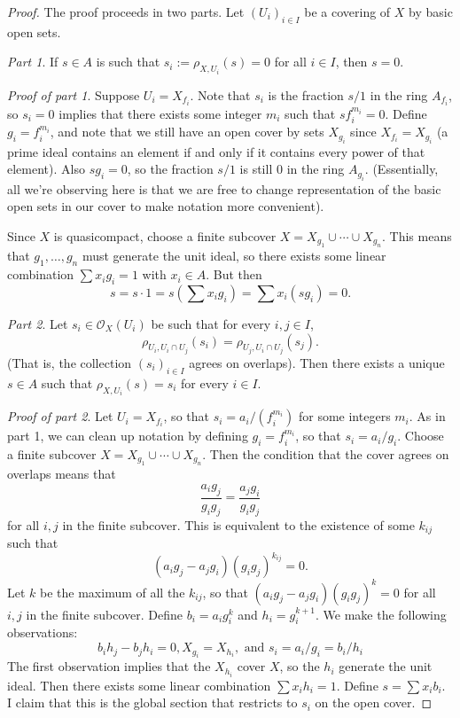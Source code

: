 \begin{proof}
The proof proceeds in two parts. Let $ (U_i)_{i \in I}$ be a
covering of $ X$ by basic open sets.

\emph{Part 1}. If $ s \in A$ is such that $ s_i := \rho_{X,
U_i}(s) = 0$ for all $ i \in I$, then $ s = 0$.

\emph{Proof of part 1}. Suppose $ U_i = X_{f_i}$. Note that $
s_i$ is the fraction $ s/1$ in the ring $ A_{f_i}$, so $ s_i =
0$ implies that there exists some integer $ m_i$ such that $
sf_i^{m_i} = 0$. Define $ g_i = f_i ^{m_i}$, and note that we
still have an open cover by sets $ X_{g_i}$ since $ X_{f_i} =
X_{g_i}$ (a prime ideal contains an element if and only if it
contains every power of that element). Also $ s g_i = 0$, so the
fraction $ s/1$ is still $ 0$ in the ring $ A_{g_i}$.
(Essentially, all we're observing here is that we are free to
change representation of the basic open sets in our cover to
make notation more convenient).

Since $ X$ is quasicompact, choose a finite subcover $ X =
X_{g_1} \cup \dotsb \cup X_{g_n}$. This means that $ g_1,
\dotsc, g_n$ must generate the unit ideal, so there exists some
linear combination $ \sum x_i g_i = 1$ with $ x_i \in A$. But
then
\[ s = s \cdot 1 = s \left( \sum x_i g_i \right) = \sum x_i (s
g_i) = 0.\]

\emph{Part 2}. Let $ s_i \in \mathcal{O}_X(U_i)$ be such that
for every $ i, j \in I$,
\[ \rho_{U_i, U_i \cap U_j}(s_i) = \rho_{U_j, U_i \cap
U_j}(s_j).\]
(That is, the collection $ (s_i)_{i \in I}$ agrees on overlaps).
Then there exists a unique $ s \in A$ such that $ \rho_{X,
U_i}(s) = s_i$ for every $ i \in I$.

\emph{Proof of part 2}. Let $ U_i = X_{f_i}$, so that $ s_i =
a_i/(f_i^{m_i})$ for some integers $ m_i$. As in part 1, we can
clean up notation by defining $ g_i = f_i^{m_i}$, so that $ s_i
= a_i/g_i$. Choose a finite subcover $ X = X_{g_1} \cup \dotsb
\cup X_{g_n}$. Then the condition that the cover agrees on
overlaps means that
\[ \frac{a_i g_j}{g_i g_j} = \frac{a_j g_i}{g_i g_j} \]
for all $ i, j$ in the finite subcover. This is equivalent to
the existence of some $ k_{ij}$ such that
\[ (a_i g_j - a_j g_i) (g_i g_j)^{k_{ij}} = 0.\]
Let $ k$ be the maximum of all the $ k_{ij}$, so that $ (a_i g_j
- a_j g_i)(g_i g_j)^k = 0$ for all $ i, j$ in the finite
subcover. Define $ b_i = a_i g_i^k$ and $ h_i = g_i^{k+1}$. We
make the following observations:
\[ b_i h_j - b_j h_i = 0, X_{g_i} = X_{h_i}, \text{ and } s_i =
a_i/g_i = b_i/h_i \]
The first observation implies that the $ X_{h_i}$ cover $ X$, so
the $ h_i$ generate the unit ideal. Then there exists some
linear combination $ \sum x_i h_i = 1$. Define $ s = \sum x_i
b_i$. I claim that this is the global section that restricts to
$ s_i$ on the open cover.


\end{proof}
